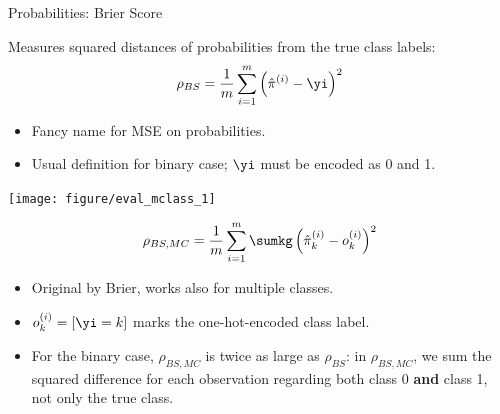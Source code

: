 \documentclass[11pt,compress,t,notes=noshow, xcolor=table]{beamer}
\newenvironment{knitrout}{}{} %
\begin{document}

\begin{vbframe}{Probabilities: Brier Score}

Measures squared distances of probabilities from the true class labels:
$$\rho_{BS} = \frac{1}{m} \sum_{i = 1}^m 
\left( \hat \pi^{(i)} - \yi \right)^2$$

\begin{itemize}
  \item Fancy name for MSE on probabilities.
  \item Usual definition for binary case; $\yi$ must be encoded as 0 and 1.
\end{itemize}

\lz

\begin{knitrout}\scriptsize
{}\color{fgcolor}

{\centering \texttt{[image: figure/eval\_mclass\_1]} 

}

\end{knitrout}


\framebreak

$$\rho_{BS, MC} = \frac{1}{m} \sum_{i = 1}^m \sumkg
\left( \hat \pi_k^{(i)} - o_k^{(i)} \right)^2$$
\begin{itemize}
  \item Original by Brier, works also for multiple classes.
  \item $ o_k^{(i)} = [ \yi = k ] $ marks the one-hot-encoded class label.
  \item For the binary case, $\rho_{BS, MC}$ is twice as large 
  as $\rho_{BS}$: in $\rho_{BS, MC}$, we sum 
  the squared difference for each observation regarding both class 0 
  \textbf{and} class 1, not only the true class.
\end{itemize}

\end{vbframe}

\end{document}
